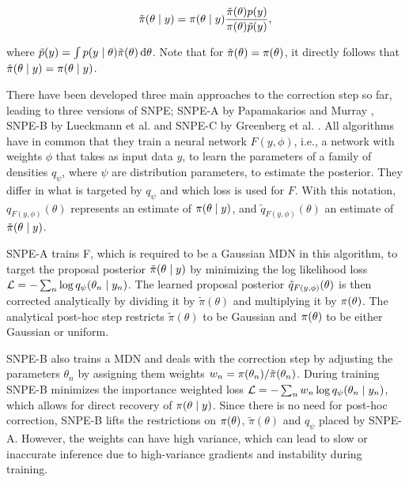 \begin{equation}\label{eq:proposal_posterior}
    \tilde{\pi} \qty(\theta \mid y) = \pi \qty(\theta \mid y) \frac{\tilde{\pi}(\theta) p(y)}{\pi \qty(\theta) \tilde{p}(y)},
\end{equation}

where $\tilde{p}(y) = \int p \qty(y \mid \theta) \tilde{\pi}(\theta)\dd{\theta}$. Note that for $\tilde{\pi}(\theta) = \pi \qty(\theta)$, it directly follows that $\tilde{\pi} \qty(\theta \mid y) = \pi \qty(\theta \mid y)$. 

There have been developed three main approaches to the correction step so far, leading to three versions of SNPE; SNPE-A by Papamakarios and Murray \cite{SNL_first}, SNPE-B by Lueckmann et al. \cite{SNPE_first} and SNPE-C by Greenberg et al. \cite{SNPE_apt}. All algorithms have in common that they train a neural network $F(y, \phi)$, i.e., a network with weights $\phi$ that takes as input data $y$, to learn the parameters of a family of densities $q_\psi$, where $\psi$ are distribution parameters, to estimate the posterior. They differ in what is targeted by $q_\psi$ and which loss is used for $F$. With this notation, $q_{F(y, \phi)} (\theta)$ represents an estimate of $\pi \qty(\theta \mid y)$, and $\tilde{q}_{F(y, \phi)} (\theta)$ an estimate of $\tilde{\pi} \qty(\theta \mid y)$.

SNPE-A trains F, which is required to be a Gaussian MDN in this algorithm, to target the proposal posterior $\tilde{\pi} \qty(\theta \mid y)$ by minimizing the log likelihood loss $\mathcal{L} = - \sum_n \log q_\psi \qty(\theta_n \mid y_n)$. The learned proposal posterior $\tilde{q}_{F(y, \phi)} \qty(\theta)$ is then corrected analytically by dividing it by $\tilde{\pi}(\theta)$ and multiplying it by $\pi \qty(\theta)$. The analytical post-hoc step restricts $\tilde{\pi}(\theta)$ to be Gaussian and $\pi \qty(\theta)$ to be either Gaussian or uniform. 

SNPE-B also trains a MDN and deals with the correction step by adjusting the parameters $\theta_n$ by assigning them weights $w_n = \pi \qty(\theta_n) / \tilde{\pi}\qty(\theta_n)$. During training SNPE-B minimizes the importance weighted loss $\mathcal{L} = - \sum_n w_n \log q_\psi \qty(\theta_n \mid y_n)$, which allows for direct recovery of $\pi \qty(\theta \mid y)$. Since there is no need for post-hoc correction, SNPE-B lifts the restrictions on $\pi \qty(\theta)$, $\tilde{\pi}(\theta)$ and $q_\psi$ placed by SNPE-A. However, the weights can have high variance, which can lead to slow or inaccurate inference due to high-variance gradients and instability during training. 

